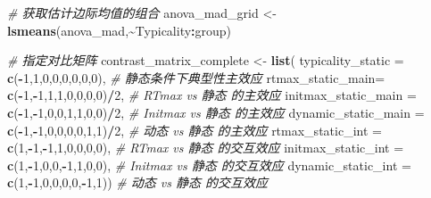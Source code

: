 \documentclass[
]{article}
\newenvironment{Shaded}{\begin{snugshade}}{\end{snugshade}}
\newcommand{\AttributeTok}[1]{\textcolor[rgb]{0.13,0.29,0.53}{#1}}
\newcommand{\CommentTok}[1]{\textcolor[rgb]{0.56,0.35,0.01}{\textit{#1}}}
\newcommand{\DecValTok}[1]{\textcolor[rgb]{0.00,0.00,0.81}{#1}}
\newcommand{\FunctionTok}[1]{\textcolor[rgb]{0.13,0.29,0.53}{\textbf{#1}}}
\newcommand{\NormalTok}[1]{#1}
\newcommand{\OtherTok}[1]{\textcolor[rgb]{0.56,0.35,0.01}{#1}}
\newcommand{\SpecialCharTok}[1]{\textcolor[rgb]{0.81,0.36,0.00}{\textbf{#1}}}
\begin{document}
\begin{Shaded}
\begin{Highlighting}[]
\CommentTok{\# 获取估计边际均值的组合}
\NormalTok{anova\_mad\_grid }\OtherTok{\textless{}{-}} \FunctionTok{lsmeans}\NormalTok{(anova\_mad,}\SpecialCharTok{\textasciitilde{}}\NormalTok{Typicality}\SpecialCharTok{:}\NormalTok{group)}

\CommentTok{\# 指定对比矩阵}
\NormalTok{contrast\_matrix\_complete }\OtherTok{\textless{}{-}} \FunctionTok{list}\NormalTok{(}
  \AttributeTok{typicality\_static =} \FunctionTok{c}\NormalTok{(}\SpecialCharTok{{-}}\DecValTok{1}\NormalTok{,}\DecValTok{1}\NormalTok{,}\DecValTok{0}\NormalTok{,}\DecValTok{0}\NormalTok{,}\DecValTok{0}\NormalTok{,}\DecValTok{0}\NormalTok{,}\DecValTok{0}\NormalTok{,}\DecValTok{0}\NormalTok{),                    }\CommentTok{\# 静态条件下典型性主效应}
  \AttributeTok{rtmax\_static\_main=}  \FunctionTok{c}\NormalTok{(}\SpecialCharTok{{-}}\DecValTok{1}\NormalTok{,}\SpecialCharTok{{-}}\DecValTok{1}\NormalTok{,}\DecValTok{1}\NormalTok{,}\DecValTok{1}\NormalTok{,}\DecValTok{0}\NormalTok{,}\DecValTok{0}\NormalTok{,}\DecValTok{0}\NormalTok{,}\DecValTok{0}\NormalTok{)}\SpecialCharTok{/}\DecValTok{2}\NormalTok{,                 }\CommentTok{\# RTmax vs 静态 的主效应}
  \AttributeTok{initmax\_static\_main =} \FunctionTok{c}\NormalTok{(}\SpecialCharTok{{-}}\DecValTok{1}\NormalTok{,}\SpecialCharTok{{-}}\DecValTok{1}\NormalTok{,}\DecValTok{0}\NormalTok{,}\DecValTok{0}\NormalTok{,}\DecValTok{1}\NormalTok{,}\DecValTok{1}\NormalTok{,}\DecValTok{0}\NormalTok{,}\DecValTok{0}\NormalTok{)}\SpecialCharTok{/}\DecValTok{2}\NormalTok{,               }\CommentTok{\# Initmax vs 静态 的主效应}
  \AttributeTok{dynamic\_static\_main =} \FunctionTok{c}\NormalTok{(}\SpecialCharTok{{-}}\DecValTok{1}\NormalTok{,}\SpecialCharTok{{-}}\DecValTok{1}\NormalTok{,}\DecValTok{0}\NormalTok{,}\DecValTok{0}\NormalTok{,}\DecValTok{0}\NormalTok{,}\DecValTok{0}\NormalTok{,}\DecValTok{1}\NormalTok{,}\DecValTok{1}\NormalTok{)}\SpecialCharTok{/}\DecValTok{2}\NormalTok{,               }\CommentTok{\# 动态 vs 静态 的主效应}
  \AttributeTok{rtmax\_static\_int =} \FunctionTok{c}\NormalTok{(}\DecValTok{1}\NormalTok{,}\SpecialCharTok{{-}}\DecValTok{1}\NormalTok{,}\SpecialCharTok{{-}}\DecValTok{1}\NormalTok{,}\DecValTok{1}\NormalTok{,}\DecValTok{0}\NormalTok{,}\DecValTok{0}\NormalTok{,}\DecValTok{0}\NormalTok{,}\DecValTok{0}\NormalTok{),                    }\CommentTok{\# RTmax vs 静态 的交互效应}
  \AttributeTok{initmax\_static\_int =} \FunctionTok{c}\NormalTok{(}\DecValTok{1}\NormalTok{,}\SpecialCharTok{{-}}\DecValTok{1}\NormalTok{,}\DecValTok{0}\NormalTok{,}\DecValTok{0}\NormalTok{,}\SpecialCharTok{{-}}\DecValTok{1}\NormalTok{,}\DecValTok{1}\NormalTok{,}\DecValTok{0}\NormalTok{,}\DecValTok{0}\NormalTok{),                  }\CommentTok{\# Initmax vs 静态 的交互效应}
  \AttributeTok{dynamic\_static\_int =} \FunctionTok{c}\NormalTok{(}\DecValTok{1}\NormalTok{,}\SpecialCharTok{{-}}\DecValTok{1}\NormalTok{,}\DecValTok{0}\NormalTok{,}\DecValTok{0}\NormalTok{,}\DecValTok{0}\NormalTok{,}\DecValTok{0}\NormalTok{,}\SpecialCharTok{{-}}\DecValTok{1}\NormalTok{,}\DecValTok{1}\NormalTok{))                  }\CommentTok{\# 动态 vs 静态 的交互效应}


\end{Highlighting}
\end{Shaded}
\end{document}

